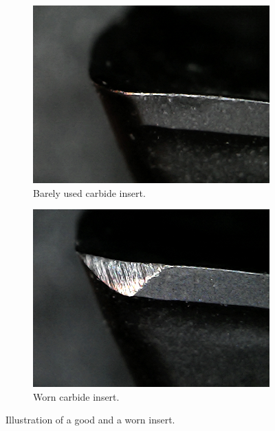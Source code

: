 \begin{figure}[hbtp]
\centering
	\begin{subfigure}{0.49\textwidth}
		\includegraphics[width=\linewidth]{fig/algemeen/plaatjes/plaatje/n_worn_insert.jpg}
		\caption{Barely used carbide insert.}
	\end{subfigure}
	\hspace*{\fill}
	\begin{subfigure}{0.49\textwidth}
		\includegraphics[width=\linewidth]{fig/algemeen/plaatjes/plaatje/worn_insert.jpg} 
		\caption{Worn carbide insert.}
	\end{subfigure}
	\caption{Illustration of a good and a worn insert.}
	\label{fig:intr:insert:wnw}
\end{figure}

